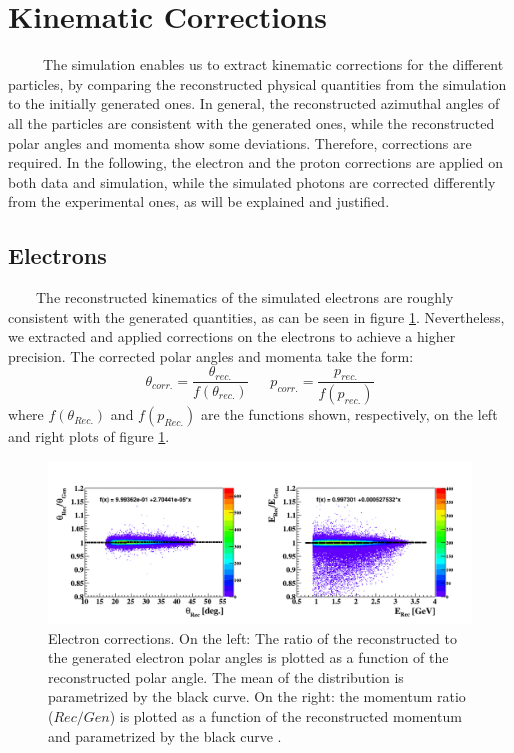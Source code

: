 \section{Kinematic Corrections}
~~~~~The simulation enables us to extract kinematic corrections for the different particles, by comparing the reconstructed physical quantities from the simulation to the initially generated ones. In general, the reconstructed azimuthal angles of all the particles are consistent with the generated ones, while the reconstructed polar angles and momenta show some deviations. Therefore, corrections are required. In the following, the electron and the proton corrections are applied on both data and simulation, while the simulated photons are corrected differently from the experimental ones, as will be explained and justified. 

\subsection{Electrons}
~~~~The reconstructed kinematics of the simulated electrons are roughly consistent with the generated quantities, as can be seen in figure \ref{fig:electron_corrections}. Nevertheless, we extracted and applied corrections on the electrons to achieve a higher precision. The corrected polar angles and momenta take the form:
\begin{equation}
\theta_{corr.} = \frac{\theta_{rec.}}{f(\theta_{rec.})} ~~~~~~~ p_{corr.} = \frac{p_{rec.}}{f(p_{rec.})}
\label{equation:correcting_function}
\end{equation}  
where $f(\theta_{Rec.})$ and $f(p_{Rec.})$ are the functions shown, respectively, on the left and right plots of figure \ref{fig:electron_corrections}.
\begin{figure}[tbp]
\centering
\includegraphics[scale=0.41]{fig_simulation/before_electron_Rec_gen.png}
\caption{Electron corrections. On the left: The ratio of the reconstructed to the generated electron polar angles is plotted as a function of the reconstructed polar angle. The mean of the distribution is parametrized by the black curve. On the right: the momentum ratio ($Rec/Gen$) is plotted as a function of the reconstructed momentum and parametrized by the black curve .} 
\label{fig:electron_corrections}
\end{figure}


